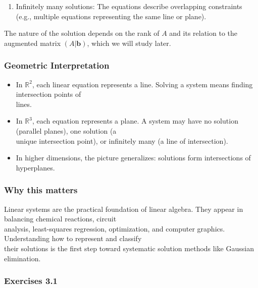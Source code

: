 \documentclass[
  12pt,
  a4paper,
]{article}
\begin{document}
\begin{enumerate}
\def\labelenumi{\arabic{enumi}.}
\item
  Infinitely many solutions: The equations describe overlapping
  constraints (e.g., multiple equations representing the same line or
  plane).
\end{enumerate}

The nature of the solution depends on the rank of \(A\) and its relation
to the augmented matrix \((A|\mathbf{b})\), which we will study later.

\subsubsection{Geometric
Interpretation}\label{geometric-interpretation-2}

\begin{itemize}
\item
  In \(\mathbb{R}^2\), each linear equation represents a line. Solving a
  system means finding intersection points of\\
  lines.
\item
  In \(\mathbb{R}^3\), each equation represents a plane. A system may
  have no solution (parallel planes), one solution (a\\
  unique intersection point), or infinitely many (a line of
  intersection).
\item
  In higher dimensions, the picture generalizes: solutions form
  intersections of hyperplanes.
\end{itemize}

\subsubsection{Why this matters}\label{why-this-matters-8}

Linear systems are the practical foundation of linear algebra. They
appear in balancing chemical reactions, circuit\\
analysis, least-squares regression, optimization, and computer graphics.
Understanding how to represent and classify\\
their solutions is the first step toward systematic solution methods
like Gaussian elimination.

\subsubsection{Exercises 3.1}\label{exercises-31}
\end{document}
